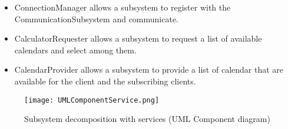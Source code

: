 \begin{itemize}
	\item ConnectionManager allows a subsystem to register with the CommunicationSubsystem and communicate.
	\item CalculatorRequester allows a subsystem to request a list of available calendars and select among them.
	\item CalendarProvider allows a subsystem to provide a list of calendar that are available for the client and the subscribing clients. 
\end{itemize}

\begin{figure}[ht!]
\centering
\texttt{[image: UMLComponentService.png]}
\caption{Subsystem decomposition with services (UML Component diagram) \label{overflow}}
\end{figure}
